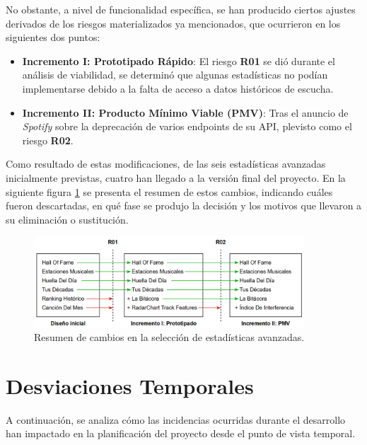No obstante, a nivel de funcionalidad específica, se han producido ciertos ajustes derivados de los riesgos materializados ya mencionados, que ocurrieron en los siguientes dos puntos:

\begin{itemize}
    \item \textbf{Incremento I: Prototipado Rápido}:  El riesgo \textbf{R01} se dió durante el análisis de viabilidad, se determinó que algunas estadísticas no podían implementarse debido a la falta de acceso a datos históricos de escucha.
    \item \textbf{Incremento II: Producto Mínimo Viable (PMV)}: Tras el anuncio de \textit{Spotify} sobre la deprecación de varios endpoints de su API, plevisto como el riesgo \textbf{R02}.
\end{itemize}

Como resultado de estas modificaciones, de las seis estadísticas avanzadas inicialmente previstas, cuatro han llegado a la versión final del proyecto. En la siguiente figura \ref{fig:estadisticas_cambio} se presenta el resumen de estos cambios, indicando cuáles fueron descartadas, en qué fase se produjo la decisión y los motivos que llevaron a su eliminación o sustitución.

\begin{figure}[H]
    \centering
    \includegraphics[width=0.9\textwidth]{figures/syc/estadisticas_cambio.png}
    \vspace{0.5cm}
    \caption{Resumen de cambios en la selección de estadísticas avanzadas.}
    \label{fig:estadisticas_cambio}
\end{figure}

\newpage

\section{Desviaciones Temporales}

A continuación, se analiza cómo las incidencias ocurridas durante el desarrollo han impactado en la planificación del proyecto desde el punto de vista temporal.

